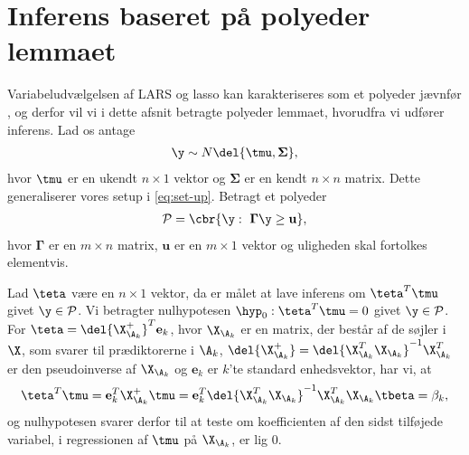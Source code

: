 \section{Inferens baseret på polyeder lemmaet} \label{subsec:teste_polyhedron}
Variabeludvælgelsen af LARS og lasso kan karakteriseres som et polyeder jævnfør \citep{post_inference}, og derfor vil vi i dette afsnit betragte polyeder lemmaet, hvorudfra vi udfører inferens.
Lad os antage
\begin{align*}
\y \sim N \del{\tmu,  \boldsymbol{\Sigma}},
\end{align*}
hvor \(\tmu\) er en ukendt \(n \times 1\) vektor og \(\boldsymbol{\Sigma}\) er en kendt \(n \times n\) matrix.
Dette generaliserer vores setup i \eqref{eq:set-up}.
Betragt et polyeder
\begin{align*}
\mathcal{P} = \cbr{\y : \ \boldsymbol{\Gamma} \y \geq \mathbf{u}},
\end{align*}
hvor \(\boldsymbol{\Gamma}\) er en \(m \times n\) matrix, \(\mathbf{u}\) er en \(m \times 1\) vektor og uligheden skal fortolkes elementvis.


Lad \(\teta\) være en \(n \times 1\) vektor, da er målet at lave inferens om \(\teta^T \tmu\) givet \(\y \in \mathcal{P}\).
Vi betragter nulhypotesen \(\hyp_0 : \teta^T \tmu = 0\) givet \(\y \in \mathcal{P}\).
For \(\teta = \del{\X_{\A_k}^+}^T \mathbf{e}_k\), hvor \(\X_{\A_k}\) er en matrix, der består af de søjler i \(\X\), som svarer til prædiktorerne i \(\A_k\), \( \del{\X_{\A_k}^+} = \del{\X_{\A_k}^T \X_{\A_k}}^{-1} \X_{\A_k}^T\) er den pseudoinverse af \(\X_{\A_k}\) og \(\mathbf{e}_k\) er \(k\)'te standard enhedsvektor, har vi, at
\begin{align}
\teta^T \tmu = \mathbf{e}_k^T \X_{\A_k}^+ \tmu =  \mathbf{e}_k^T \del{\X_{\A_k}^T \X_{\A_k}}^{-1} \X_{\A_k}^T \X_{\A_k} \tbeta = \beta_k, \label{eq:tg_beta}
\end{align}
og nulhypotesen svarer derfor til at teste om koefficienten af den sidst tilføjede variabel, i regressionen af \(\tmu\) på \(\X_{\A_k}\), er lig 0.

